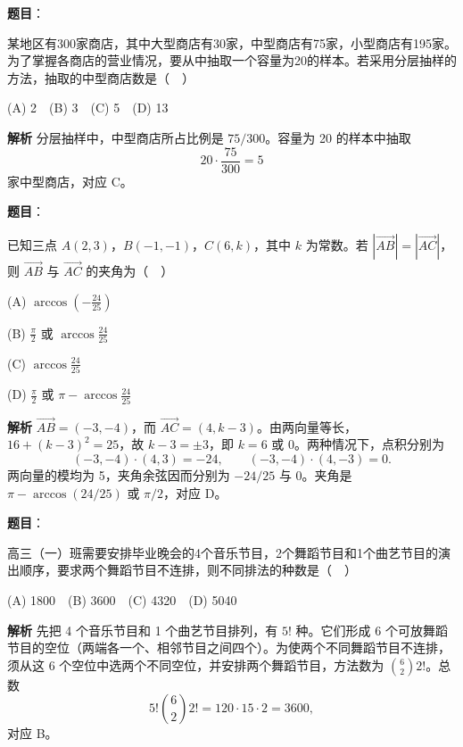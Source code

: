 \begin{answer}

\textbf{题目}：

某地区有300家商店，其中大型商店有30家，中型商店有75家，小型商店有195家。为了掌握各商店的营业情况，要从中抽取一个容量为20的样本。若采用分层抽样的方法，抽取的中型商店数是（　）

(A) 2　(B) 3　(C) 5　(D) 13

\textbf{解析}
分层抽样中，中型商店所占比例是 \(75/300\)。容量为 20 的样本中抽取
\nopagebreak[4]
\[
20\cdot\frac{75}{300}=5
\]
家中型商店，对应 C。


\end{answer}
\begin{answer}

\textbf{题目}：

已知三点 \(A(2,3)\)，\(B(-1,-1)\)，\(C(6,k)\)，其中 \(k\) 为常数。若 \(|\overrightarrow{AB}|=|\overrightarrow{AC}|\)，则 \(\overrightarrow{AB}\) 与 \(\overrightarrow{AC}\) 的夹角为（　）

(A) \(\arccos\left(-\frac{24}{25}\right)\)

(B) \(\frac\pi2\) 或 \(\arccos\frac{24}{25}\)

(C) \(\arccos\frac{24}{25}\)

(D) \(\frac\pi2\) 或 \(\pi-\arccos\frac{24}{25}\)

\textbf{解析}
\(\overrightarrow{AB}=(-3,-4)\)，而 \(\overrightarrow{AC}=(4,k-3)\)。由两向量等长，\(16+(k-3)^2=25\)，故 \(k-3=\pm3\)，即 \(k=6\) 或 0。两种情况下，点积分别为
\nopagebreak[4]
\[
(-3,-4)\cdot(4,3)=-24,\qquad (-3,-4)\cdot(4,-3)=0.
\]
两向量的模均为 5，夹角余弦因而分别为 \(-24/25\) 与 0。夹角是 \(\pi-\arccos(24/25)\) 或 \(\pi/2\)，对应 D。


\end{answer}
\begin{answer}

\textbf{题目}：

高三（一）班需要安排毕业晚会的4个音乐节目，2个舞蹈节目和1个曲艺节目的演出顺序，要求两个舞蹈节目不连排，则不同排法的种数是（　）

(A) 1800　(B) 3600　(C) 4320　(D) 5040

\textbf{解析}
先把 4 个音乐节目和 1 个曲艺节目排列，有 \(5!\) 种。它们形成 6 个可放舞蹈节目的空位（两端各一个、相邻节目之间四个）。为使两个不同舞蹈节目不连排，须从这 6 个空位中选两个不同空位，并安排两个舞蹈节目，方法数为 \(\binom62 2!\)。总数
\nopagebreak[4]
\[
5!\binom62 2!=120\cdot15\cdot2=3600,
\]
对应 B。


\end{answer}
